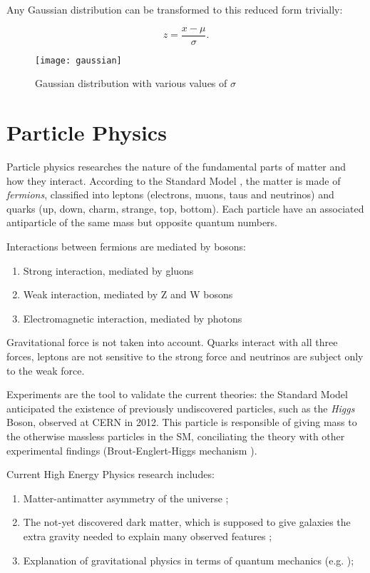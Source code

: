 Any Gaussian distribution can be transformed to this reduced form trivially:

\begin{equation}
	z = \frac{x-\mu}{\sigma}.
\end{equation}

\begin{figure}
	\centerline{
		\texttt{[image: gaussian]}}
	\caption{Gaussian distribution with various values of $\sigma$ \cite{leo2012techniques}}
\end{figure}

\section{Particle Physics}

Particle physics researches the nature of the fundamental parts of matter and how they interact. According to the Standard Model \cite{Quang:1998yw}, the matter is made of \textit{fermions}, classified into leptons (electrons, muons, taus and neutrinos) and quarks (up, down, charm, strange, top, bottom). Each particle have an associated antiparticle of the same mass but opposite quantum numbers.

Interactions between fermions are mediated by bosons:

\begin{enumerate}
	\item Strong interaction, mediated by gluons
	\item Weak interaction, mediated by Z and W bosons
	\item Electromagnetic interaction, mediated by photons
\end{enumerate}

Gravitational force is not taken into account. Quarks interact with all three forces, leptons are not sensitive to the strong force and neutrinos are subject only to the weak force.

Experiments are the tool to validate the current theories: the Standard Model anticipated the existence of previously undiscovered particles, such as the \textit{Higgs} Boson, observed at CERN in 2012. This particle is responsible of giving mass to the otherwise massless particles in the SM, conciliating the theory with other experimental findings (Brout-Englert-Higgs mechanism \cite{PhysRevLett.13.321, PhysRevLett.13.508}).

Current High Energy Physics research includes:
\begin{enumerate}
	\item Matter-antimatter asymmetry of the universe \cite{Bernreuther:2002uj};
	\item The not-yet discovered dark matter, which is supposed to give galaxies the extra gravity needed to explain many observed features \cite{bertone2005particle};
	\item Explanation of gravitational physics in terms of quantum mechanics (e.g. \cite{Rovelli:2011eq});
\end{enumerate}

